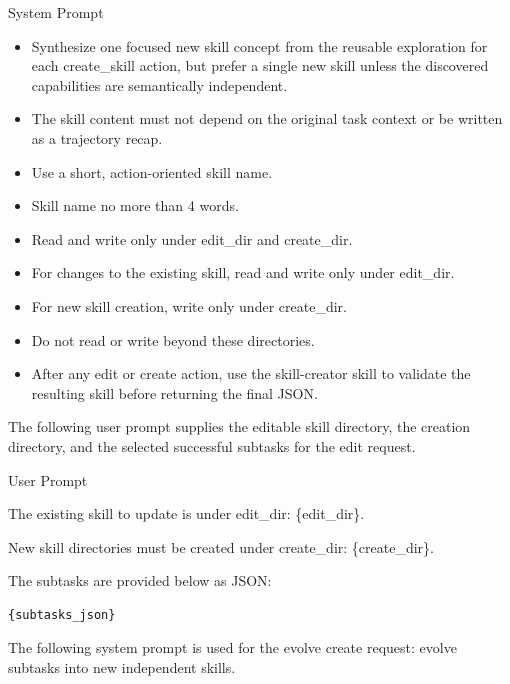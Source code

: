 \documentclass{llmxive}
\providecommand{\svpromptheading}[1]{\par\smallskip\noindent{\sffamily\bfseries#1}\par}
\providecommand{\svinlinecode}[1]{{\ttfamily #1}}
\begin{document}
\begin{svpromptbox}{System Prompt}
\begin{itemize}
\item Synthesize one focused new skill concept from the reusable exploration for each \svinlinecode{create\_skill} action, but prefer a single new skill unless the discovered capabilities are semantically independent.
\item The skill content must not depend on the original task context or be written as a trajectory recap.
\item Use a short, action-oriented skill name.
\item Skill name no more than 4 words.
\end{itemize}
\smallskip
\svpromptheading{Constraint}
\smallskip
\begin{itemize}
\item Read and write only under \svinlinecode{edit\_dir} and \svinlinecode{create\_dir}.
\item For changes to the existing skill, read and write only under \svinlinecode{edit\_dir}.
\item For new skill creation, write only under \svinlinecode{create\_dir}.
\item Do not read or write beyond these directories.
\item After any edit or create action, use the \svinlinecode{skill-creator} skill to validate the resulting skill before returning the final JSON.
\end{itemize}

\end{svpromptbox}

\noindent The following user prompt supplies the editable skill directory, the creation directory, and the selected successful subtasks for the edit request.\par

\begin{svpromptbox}{User Prompt}

The existing skill to update is under \svinlinecode{edit\_dir: \{edit\_dir\}}.\par
New skill directories must be created under \svinlinecode{create\_dir: \{create\_dir\}}.\par
\smallskip
The subtasks are provided below as JSON:\par
\smallskip
\begin{lstlisting}[style=svpromptcode]
{subtasks_json}
\end{lstlisting}

\end{svpromptbox}

\noindent The following system prompt is used for the evolve create request: evolve subtasks into new independent skills.\par
\end{document}

